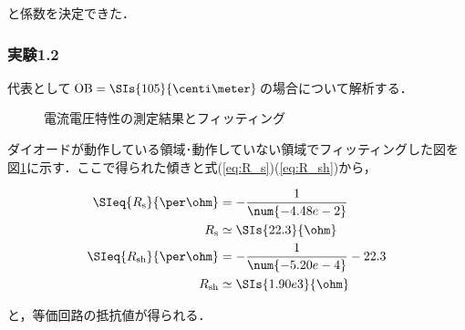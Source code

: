 \documentclass[1_power_supply.tex]{subfiles}
\begin{document}
      と係数を決定できた．

    \subsubsection{実験1.2}

      代表として$\mathrm{OB}=\SIs{105}{\centi\meter}$の場合について解析する．


      \begin{figure}[htbp]
        \begin{center}
          \caption{電流電圧特性の測定結果とフィッティング}\label{fig:1_VI_fit}
        \end{center}
      \end{figure}

      ダイオードが動作している領域･動作していない領域でフィッティングした図を図\ref{fig:1_VI_fit}に示す．ここで得られた傾きと式(\ref{eq:R_s})(\ref{eq:R_sh})から，

      \begin{align}
        \SIeq{R_\mathrm{s}}{\per\ohm}  &=      -\frac{1}{\num{-4.48e-2}}  \\
        R_\mathrm{s}                   &\simeq \SIs{22.3}{\ohm}  \\
        \SIeq{R_\mathrm{sh}}{\per\ohm} &=      -\frac{1}{\num{-5.20e-4}}-22.3  \\
        R_\mathrm{sh}                  &\simeq \SIs{1.90e3}{\ohm}
      \end{align}

      と，等価回路の抵抗値が得られる．
\end{document}
